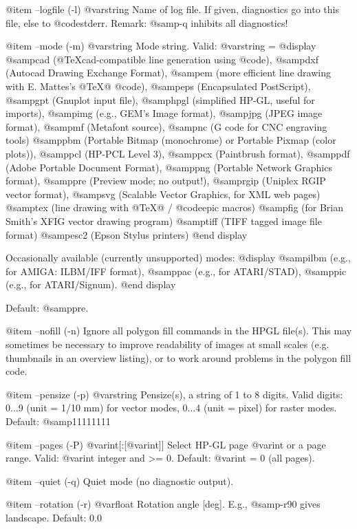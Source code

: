 @item --logfile (-l) @var{string}
Name of log file. If given, diagnostics go into this file, else to
@code{stderr}. Remark: @samp{-q} inhibits all diagnostics!

@item --mode (-m) @var{string}
Mode string. Valid: @var{string} =
@display
  @samp{cad}  (@TeX{}cad-compatible line generation using @code{}),
  @samp{dxf}  (Autocad Drawing Exchange Format),
  @samp{em}   (more efficient line drawing with E. Mattes's @TeX{}@ @code{}),
  @samp{eps}  (Encapsulated PostScript),
  @samp{gpt}  (Gnuplot input file),
  @samp{hpgl} (simplified HP-GL, useful for imports),
  @samp{img}  (e.g., GEM's Image format),
  @samp{jpg}  (JPEG image format),
  @samp{mf}   (Metafont source),
  @samp{nc}   (G code for CNC engraving tools)
  @samp{pbm}  (Portable Bitmap (monochrome) or Portable Pixmap (color plots)),
  @samp{pcl}  (HP-PCL Level 3),
  @samp{pcx}  (Paintbrush format),
  @samp{pdf}  (Adobe Portable Document Format),
  @samp{png}  (Portable Network Graphics format),
  @samp{pre}  (Preview mode; no output!),
  @samp{rgip} (Uniplex RGIP vector format),
  @samp{svg}  (Scalable Vector Graphics, for XML web pages)
  @samp{tex}  (line drawing with @TeX{}@ / @code{epic} macros)
  @samp{fig}  (for Brian Smith's XFIG vector drawing program)
  @samp{tiff} (TIFF tagged image file format)
  @samp{esc2} (Epson Stylus printers)
@end display

Occasionally available (currently unsupported) modes:
@display
  @samp{ilbm} (e.g., for AMIGA: ILBM/IFF format),
  @samp{pac}  (e.g., for ATARI/STAD),
  @samp{pic}  (e.g., for ATARI/Signum).
@end display

Default: @samp{pre}.

@item --nofill (-n)
Ignore all polygon fill commands in the HPGL file(s). This may sometimes
be necessary to improve readability of images at small scales (e.g. thumbnails in
an overview listing), or to work around problems in the polygon fill code. 

@item --pensize (-p) @var{string}
Pensize(s), a string of 1 to 8 digits.
Valid digits: 0...9 (unit = 1/10 mm) for vector modes,
0...4 (unit = pixel) for raster modes. Default: @samp{11111111}

@item --pages (-P) @var{int}[:[@var{int}]]
Select HP-GL page @var{int} or a page range.
Valid: @var{int} integer and >= 0. Default: @var{int} = 0 (all pages).

@item --quiet (-q)
Quiet mode (no diagnostic output).

@item --rotation (-r) @var{float}
Rotation angle [deg]. E.g., @samp{-r90} gives landscape. Default: 0.0

